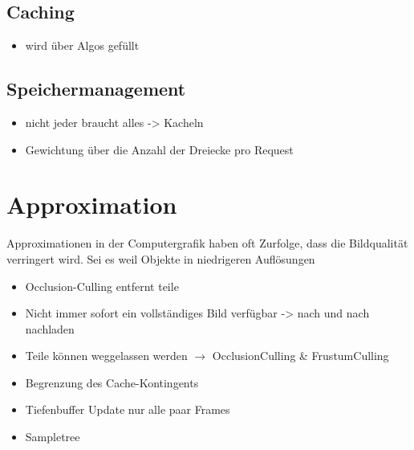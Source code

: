 \subsection{Caching}
\label{sec:basics:caching}
\begin{itemize}
 \item wird über Algos gefüllt
\end{itemize}

\subsection{Speichermanagement}
\label{sec:basics:speichermanagement}
\begin{itemize}
 \item nicht jeder braucht alles -> Kacheln
 \item Gewichtung über die Anzahl der Dreiecke pro Request
\end{itemize}

\section{Approximation}
\label{sec:basics:approximation}
Approximationen in der Computergrafik haben oft  Zurfolge, dass die Bildqualität verringert wird. Sei es weil Objekte in niedrigeren Auflösungen
\begin{itemize}
 \item Occlusion-Culling entfernt teile
 \item Nicht immer sofort ein vollständiges Bild verfügbar -> nach und nach nachladen
 \item Teile können weggelassen werden $\rightarrow$ OcclusionCulling \& FrustumCulling
 \item Begrenzung des Cache-Kontingents
 \item Tiefenbuffer Update nur alle paar Frames
 \item Sampletree
\end{itemize}
